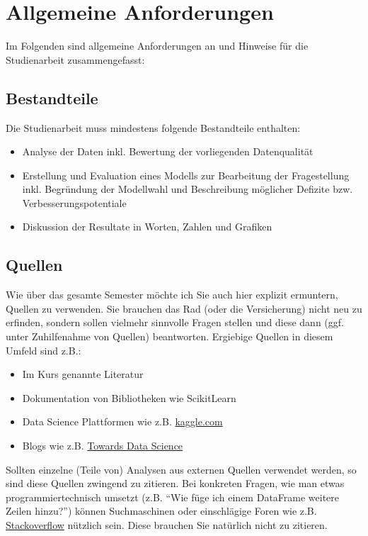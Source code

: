 \documentclass[11pt,a4paper]{article}
\begin{document}
\header[Studienarbeit]

\section*{Allgemeine Anforderungen}
Im Folgenden sind allgemeine Anforderungen an und Hinweise für die Studienarbeit zusammengefasst:
\subsection*{Bestandteile}
Die Studienarbeit muss mindestens folgende Bestandteile enthalten:
\begin{itemize}
	\item Analyse der Daten inkl. Bewertung der vorliegenden Datenqualität
	\item Erstellung und Evaluation eines Modells zur Bearbeitung der Fragestellung inkl. Begründung der Modellwahl und Beschreibung möglicher Defizite bzw. Verbesserungs\-potentiale
	\item Diskussion der Resultate in Worten, Zahlen und Grafiken
\end{itemize}

\subsection*{Quellen}
Wie über das gesamte Semester möchte ich Sie auch hier explizit ermuntern, Quellen zu verwenden. Sie brauchen das Rad (oder die Versicherung) nicht neu zu erfinden, sondern sollen vielmehr sinnvolle Fragen stellen und diese dann (ggf. unter Zuhilfenahme von Quellen) beantworten. Ergiebige Quellen in diesem Umfeld sind z.B.:
\begin{itemize}
	\item Im Kurs genannte Literatur
	\item Dokumentation von Bibliotheken wie ScikitLearn
	\item Data Science Plattformen wie z.B. \href{https://www.kaggle.com/}{kaggle.com}
	\item Blogs wie z.B. \href{https://towardsdatascience.com/}{Towards Data Science}
\end{itemize}
Sollten einzelne (Teile von) Analysen aus externen Quellen verwendet werden, so sind diese Quellen zwingend zu zitieren.
Bei konkreten Fragen, wie man etwas programmiertechnisch umsetzt (z.B. ``Wie füge ich einem DataFrame weitere Zeilen hinzu?'') können Suchmaschinen oder einschlägige Foren wie z.B. \href{https://stackoverflow.com/}{Stack\-overflow} nützlich sein. Diese brauchen Sie natürlich nicht zu zitieren.
\end{document}
